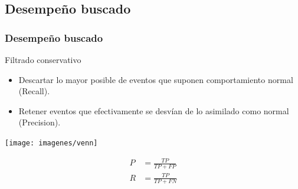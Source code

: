 \subsection{Desempeño buscado}
\watermarkoff
\begin{frame}[t,fragile]
	\frametitle {Desempeño buscado}
	
	\begin{block}{Filtrado conservativo}
		\begin{itemize}
			\item \scriptsize{Descartar lo mayor posible de eventos que suponen comportamiento normal (Recall).}
			\item Retener eventos que efectivamente se desvían de lo asimilado como normal (Precision).
		\end{itemize}
	\end{block}
	\pause
	
	\hfill
		
	\noindent\begin{minipage}{.75\textwidth}
		\centering
		\texttt{[image: imagenes/venn]}
	\end{minipage}
	\begin{minipage}{.15\textwidth}
		\begin{align*}
			P &= \frac{TP}{TP + FP}\\
			R &= \frac{TP}{TP + FN}
		\end{align*}
	\end{minipage}
	
\end{frame}
\watermarkon

